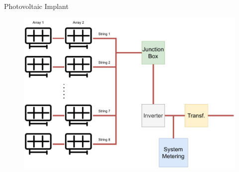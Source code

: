 \begin{frame}{Photovoltaic Implant}
	\begin{figure}
		\centering
		\includegraphics[width=.9\textwidth]{sections/0_intro/imgs/pvplant.pdf}
	\end{figure}
\end{frame}

